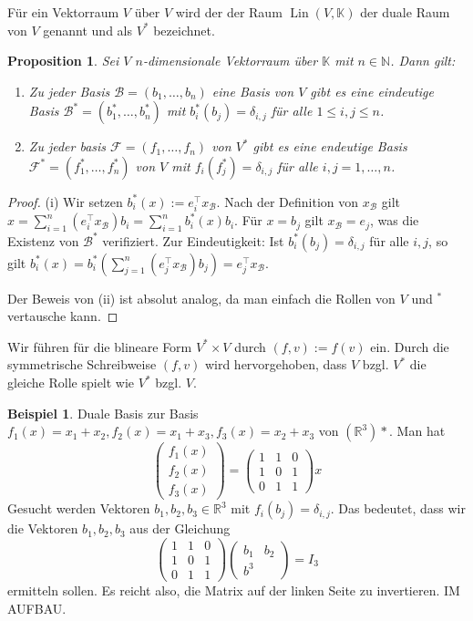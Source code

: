 \documentclass[
a4paper,12pt,
bibliography=totocnumbered,
numbers=noenddot,
]{scrartcl}
\numberwithin{equation}{subsection}
\newcommand{\N}{\mathbb N}
\newcommand{\R}{\mathbb R}
\newcommand{\K}{\mathbb K}
\newcommand{\Lin}{\operatorname{Lin}} %
\newcommand{\cB}{\mathcal{B}}
\newcommand{\cF}{\mathcal{F}}
\theoremstyle{plain}
\newtheorem*{propn}{Proposition}
\theoremstyle{definition}
\newtheorem*{bsp}{Beispiel}
\begin{document}
Für ein Vektorraum $V$ über $V$ wird der der Raum $\Lin(V,\K)$ der duale Raum von $V$ genannt und als $V^\ast$ bezeichnet. 

\begin{propn}
	Sei $V$ $n$-dimensionale Vektorraum über $\K$ mit $n \in \N$. Dann gilt: 
	\begin{enumerate} 
		\item Zu jeder Basis $\cB=(b_1,\ldots,b_n)$ eine Basis von $V$ gibt es eine eindeutige Basis $\cB^\ast= (b_1^\ast,\ldots, b_n^\ast)$ mit $b^\ast_i(b_j) = \delta_{i,j}$ für alle $1 \le i ,j \le n$. 
		\item Zu jeder basis $\cF= (f_1,\ldots,f_n)$  von $V^\ast$ gibt es eine endeutige Basis $\cF^\ast = (f_1^\ast,\ldots, f_n^\ast)$ von $V$ mit $f_i(f_j^\ast) = \delta_{i,j}$ für alle $i,j=1,\ldots,n$. 
	\end{enumerate} 
\end{propn}
\begin{proof} 
	(i) Wir setzen $b_i^\ast (x) := e_i^\top x_\cB$. Nach der Definition von $x_\cB$ gilt $x = \sum_{i=1}^n (e_i^\top x_\cB) b_i = \sum_{i=1}^n b_i^\ast(x) b_i$. Für $x = b_j$ gilt $x_\cB= e_j$, was die Existenz von $\cB^\ast$ verifiziert. Zur Eindeutigkeit: Ist $b_i^\ast(b_j) = \delta_{i,j}$ für alle $i,j$, so gilt $b_i^\ast(x) = b_i^\ast( \sum_{j=1}^n (e_j^\top x_\cB) b_j ) = e_j^\top x_\cB$. 
	
	Der Beweis von (ii) ist absolut analog, da man einfach die Rollen von $V$ und $^\ast$ vertausche kann. 
\end{proof} 

Wir führen für die blineare Form $V^\ast \times V$ durch $(f,v) := f(v)$ ein. Durch die symmetrische Schreibweise $(f,v)$ wird hervorgehoben, dass $V$ bzgl. $V^\ast$ die gleiche Rolle spielt wie $V^\ast$ bzgl. $V$. 

\begin{bsp}
	Duale Basis zur Basis $f_1(x) = x_1 + x_2, f_2(x) = x_1 + x_3, f_3(x) = x_2 + x_3$ von $(\R^3)\ast$. Man hat 
	\[
			\begin{pmatrix}
					f_1(x) \\ f_2(x) \\ f_3(x)  
			\end{pmatrix} 
			= 
			\begin{pmatrix}
					1 & 1& 0
					\\ 1 & 0 & 1 
					\\ 0 & 1 & 1 
			\end{pmatrix}
			x
	\]
	Gesucht werden Vektoren $b_1,b_2, b_3\in \R^3$ mit $f_i(b_j) = \delta_{i,j}$. Das bedeutet, dass wir die Vektoren $b_1,b_2,b_3$ aus der Gleichung 
	\[
			\begin{pmatrix}
	1 & 1& 0
	\\ 1 & 0 & 1 
	\\ 0 & 1 & 1 
\end{pmatrix}		
	\begin{pmatrix} b_1 & b_2 \\ b^3
	\end{pmatrix} 
	= I_3
	\]
	ermitteln sollen. Es reicht also, die Matrix auf der linken Seite zu invertieren. IM AUFBAU. 
\end{bsp} 
\end{document}
